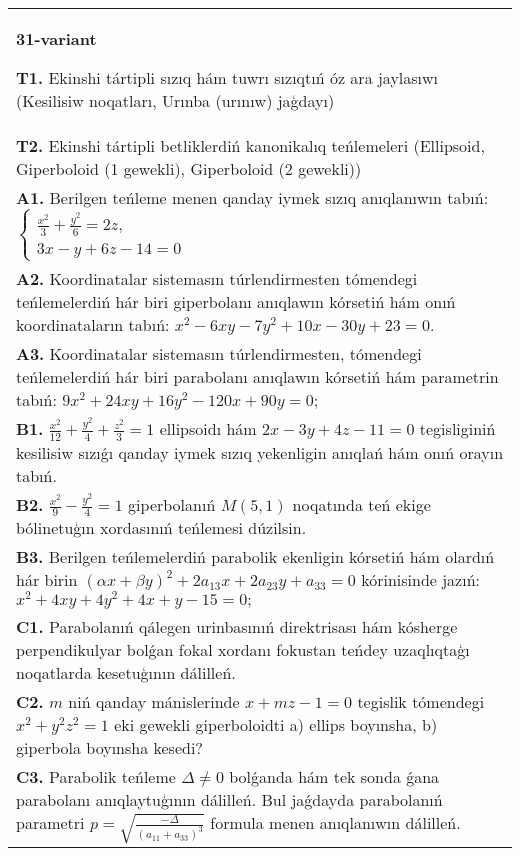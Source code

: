 \documentclass{article}
\begin{document}
\begin{tabular}{m{17cm}}
\textbf{31-variant}
\newline

\textbf{T1.} Ekinshi tártipli sızıq hám tuwrı sızıqtıń óz ara jaylasıwı (Kesilisiw noqatları, Urınba (urınıw) jaģdayı) \\
\textbf{T2.} Ekinshi tártipli betliklerdiń kanonikalıq teńlemeleri (Ellipsoid, Giperboloid (1 gewekli), Giperboloid (2 gewekli)) \\
\textbf{A1.} Berilgen teńleme menen qanday iymek sızıq anıqlanıwın tabıń: $\left\{\begin{array}{l}\frac{x^2}{3}+\frac{y^2}{6}=2 z, \\ 3 x-y+6 z-14=0\end{array}\right.$ \\
\textbf{A2.} Koordinatalar sistemasın túrlendirmesten tómendegi teńlemelerdiń hár biri giperbolanı anıqlawın kórsetiń hám onıń koordinataların tabıń: $x^2-6 x y-7 y^2+10 x-30 y+23=0$. \\
\textbf{A3.} Koordinatalar sistemasın túrlendirmesten, tómendegi teńlemelerdiń hár biri parabolanı anıqlawın kórsetiń hám parametrin tabıń: $9 x^2+24 x y+16 y^2-120 x+90 y=0$; \\
\textbf{B1.} $\frac{x^2}{12}+\frac{y^2}{4}+\frac{z^2}{3}=1$ ellipsoidı hám $2x-3y+4z-11=0$ tegisliginiń kesilisiw sızıǵı qanday iymek sızıq yekenligin anıqlań hám onıń orayın tabıń. \\
\textbf{B2.} $\frac{x^2}{9}-\frac{y^2}{4}=1$ giperbolanıń $M (5,1) $ noqatında teń ekige bólinetuģın xordasınıń teńlemesi dúzilsin. \\
\textbf{B3.} Berilgen teńlemelerdiń parabolik ekenligin kórsetiń hám olardıń hár birin $(\alpha x+\beta y)^2+2 a_{13} x+2 a_{23} y+a_{33}=0$ kórinisinde jazıń: $x^2+4 x y+4 y^2+4 x+y-15=0 ;$ \\
\textbf{C1.} Parabolanıń qálegen urinbasınıń direktrisası hám kósherge perpendikulyar bolǵan fokal xordanı fokustan teńdey uzaqlıqtaģı noqatlarda kesetuģının dálilleń. \\
\textbf{C2.} $m$ niń qanday mánislerinde $x+mz-1=0$ tegislik tómendegi $x^2+y^2z^2=1$ eki gewekli giperboloidti a) ellips boyınsha, b) giperbola boyınsha kesedi? \\
\textbf{C3.} Parabolik teńleme $\Delta \neq 0$ bolǵanda hám tek sonda ǵana parabolanı anıqlaytuģının dálilleń. Bul jaǵdayda parabolanıń parametri $p=\sqrt{\frac{-\Delta}{ (a_{11}+a_{33}) ^3}}$ formula menen anıqlanıwın dálilleń. \\

\end{tabular}
\vspace{1cm}
\end{document}
